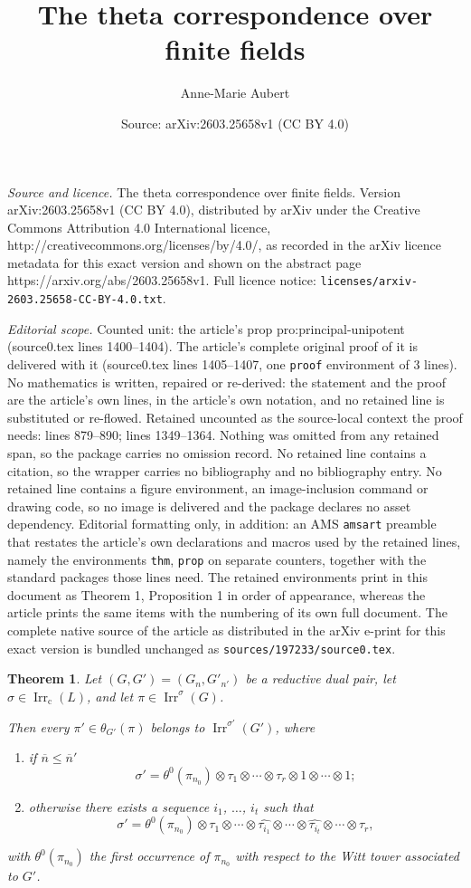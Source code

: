 \documentclass[10pt,a4paper]{amsart}
\title{The theta correspondence over finite fields}
\author{Anne-Marie Aubert}
\date{Source: arXiv:2603.25658v1 (CC BY 4.0)}
\newtheorem{thm}{Theorem}
\newcommand{\Irr}{\operatorname{Irr}}
\newcommand{\cc}{\mathrm{c}}
\begin{document}
\maketitle

\noindent\emph{Source and licence.} The theta correspondence over finite fields. Version arXiv:2603.25658v1 (CC BY 4.0), distributed by arXiv under the Creative Commons Attribution 4.0 International licence, http://creativecommons.org/licenses/by/4.0/, as recorded in the arXiv licence metadata for this exact version and shown on the abstract page https://arxiv.org/abs/2603.25658v1. Full licence notice: \texttt{licenses/arxiv-2603.25658-CC-BY-4.0.txt}.\par\smallskip

\noindent\textit{Editorial scope.} Counted unit: the article's prop pro:principal-unipotent (source0.tex lines 1400--1404). The article's complete original proof of it is delivered with it (source0.tex lines 1405--1407, one \texttt{proof} environment of 3 lines). No mathematics is written, repaired or re-derived: the statement and the proof are the article's own lines, in the article's own notation, and no retained line is substituted or re-flowed.  Retained uncounted as the source-local context the proof needs: lines 879--890; lines 1349--1364.  Nothing was omitted from any retained span, so the package carries no omission record.  No retained line contains a citation, so the wrapper carries no bibliography and no bibliography entry.  No retained line contains a figure environment, an image-inclusion command or drawing code, so no image is delivered and the package declares no asset dependency.  Editorial formatting only, in addition: an AMS \texttt{amsart} preamble that restates the article's own declarations and macros used by the retained lines, namely the environments \texttt{thm}, \texttt{prop} on separate counters, together with the standard packages those lines need.  The retained environments print in this document as Theorem 1, Proposition 1 in order of appearance, whereas the article prints the same items with the numbering of its own full document.  The complete native source of the article as distributed in the arXiv e-print for this exact version is bundled unchanged as \texttt{sources/197233/source0.tex}.
\begin{thm} \label{thm:HC-HC}
Let $(G,G')=(G_n,G'_{n'})$ be a reductive dual pair, let $\sigma\in\Irr_\cc(L)$, and let $\pi\in\Irr^\sigma(G)$. 

Then every $\pi'\in\theta_{G'}(\pi)$ belongs to $\Irr^{\sigma'}(G')$, where
\begin{enumerate} 
\item if $\overline{n}\le\overline{n}'$
\[\sigma'=\theta^0(\pi_{n_0})\otimes\tau_1\otimes\cdots\otimes\tau_r\otimes 1\otimes\cdots\otimes 1;\]
\item otherwise there exists a sequence $i_1$, $\ldots$, $i_t$ such that
\[\sigma'=\theta^0(\pi_{n_0})\otimes\tau_1\otimes\cdots\otimes\widehat{\tau_{i_1}}\otimes\cdots\otimes\widehat{\tau_{i_t}}\otimes\cdots\otimes\tau_r,\]
\end{enumerate}
with $\theta^0(\pi_{n_0})$ the first  occurrence of $\pi_{n_0}$ with respect to the Witt tower associated to $G'$.
\end{thm}
\end{document}
